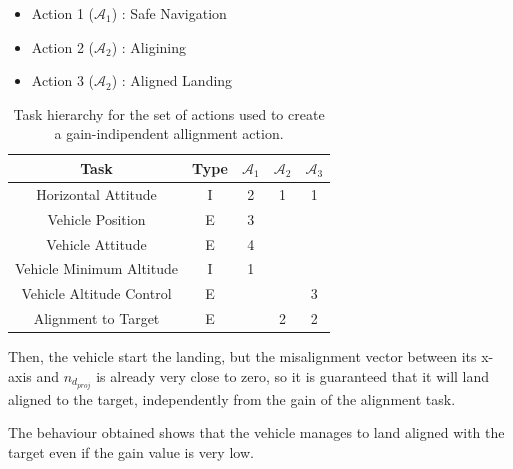 \documentclass{article}
\begin{document}
\begin{table}[htb]
	\caption{Task hierarchy for the set of actions used to create a gain-indipendent allignment action.}
	\begin{itemize}
		\item Action 1 ($\mathcal{A}_{1}$) : Safe Navigation
		\item Action 2 ($\mathcal{A}_{2}$) : Aligining
		\item Action 3 ($\mathcal{A}_{2}$) : Aligned Landing
	\end{itemize}
	\label{tb_align:actions_table}
	\begin{center}
		\footnotesize
		\begin{tabular}{ccccc}
			\toprule
			Task & Type & $\mathcal{A}_{1}$ & $\mathcal{A}_{2}$ & $\mathcal{A}_{3}$\\
			\midrule
			Horizontal Attitude             & I & 2 & 1 & 1 \\
			\hdashline
			Vehicle Position				& E & 3 &   &   \\
			\hdashline
			Vehicle Attitude                & E & 4 &   &   \\
			\hdashline
			Vehicle Minimum Altitude        & I & 1 &   &   \\
			\hdashline
			Vehicle Altitude Control        & E &   &   & 3 \\
			\hdashline
			Alignment to Target             & E &   & 2 & 2 \\
			
			\bottomrule
		\end{tabular}
	\end{center}
\end{table}%

Then, the vehicle start the landing, but the misalignment vector between its x-axis and \(n_{d_{proj}}\) is already very close to zero, so it is guaranteed that it will land aligned to the target, independently from the gain of the alignment task.
\begin{figure}[H]
	\centering
	\label{im:v_land_gain0_1_ind}
\end{figure} 
The behaviour obtained shows that the vehicle manages to land aligned with the target even if the gain value is very low.
 
\end{document}
